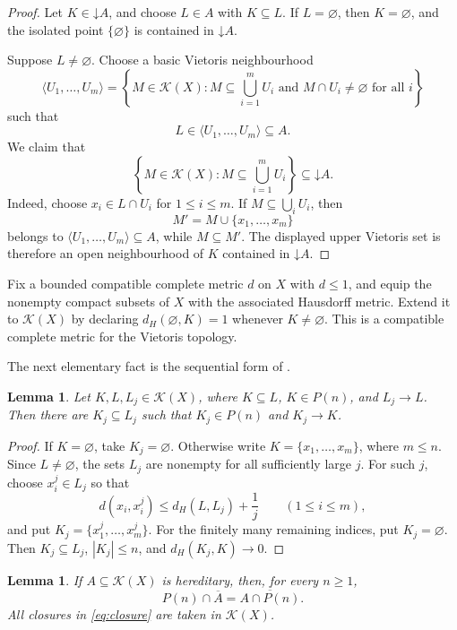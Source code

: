 \documentclass[10pt,a4paper]{amsart}
\newtheorem{lemma}[theorem]{Lemma}
\newcommand{\K}{\mathcal K}
\newcommand{\cl}[1]{\overline{#1}}
\newcommand{\down}[1]{\mathord{\downarrow}\!#1}
\begin{document}
\begin{proof}
Let $K\in\down A$, and choose $L\in A$ with $K\subseteq L$.
If $L=\varnothing$, then $K=\varnothing$, and the isolated point
$\{\varnothing\}$ is contained in $\down A$.

Suppose $L\neq\varnothing$. Choose a basic Vietoris neighbourhood
\[
\langle U_1,\ldots,U_m\rangle
=
\left\{
M\in\K(X):
M\subseteq\bigcup_{i=1}^m U_i
\text{ and }
M\cap U_i\neq\varnothing\text{ for all }i
\right\}
\]
such that
\[
L\in\langle U_1,\ldots,U_m\rangle\subseteq A.
\]
We claim that
\[
\left\{
M\in\K(X):M\subseteq\bigcup_{i=1}^m U_i
\right\}
\subseteq\down A.
\]
Indeed, choose $x_i\in L\cap U_i$ for $1\leq i\leq m$. If
$M\subseteq\bigcup_iU_i$, then
\[
M'=M\cup\{x_1,\ldots,x_m\}
\]
belongs to $\langle U_1,\ldots,U_m\rangle\subseteq A$, while
$M\subseteq M'$. The displayed upper Vietoris set is therefore an open
neighbourhood of $K$ contained in $\down A$.
\end{proof}

Fix a bounded compatible complete metric $d$ on $X$ with $d \leq 1$, and equip the nonempty compact subsets of $X$ with the
associated Hausdorff metric. Extend it to $\K(X)$ by declaring
$d_H(\varnothing,K)=1$ whenever $K\neq\varnothing$. This is a compatible
complete metric for the Vietoris topology.

The next elementary fact is the sequential form of
\cite[Lemma~2.6(i)]{MZ05}.

\begin{lemma}\label{lem:finite-approx}
Let $K,L,L_j\in\K(X)$, where $K\subseteq L$, $K\in P(n)$, and
$L_j\to L$. Then there are $K_j\subseteq L_j$ such that
$K_j\in P(n)$ and $K_j\to K$.
\end{lemma}

\begin{proof}
If $K=\varnothing$, take $K_j=\varnothing$. Otherwise write
$K=\{x_1,\ldots,x_m\}$, where $m\leq n$. Since $L\neq\varnothing$,
the sets $L_j$ are nonempty for all sufficiently large $j$. For such
$j$, choose $x_i^j\in L_j$ so that
\[
d(x_i,x_i^j)\leq d_H(L,L_j)+\frac1j
\qquad (1\leq i\leq m),
\]
and put $K_j=\{x_1^j,\ldots,x_m^j\}$. For the finitely many remaining
indices, put $K_j=\varnothing$. Then $K_j\subseteq L_j$,
$|K_j|\leq n$, and $d_H(K_j,K)\to0$.
\end{proof}

\begin{lemma}\label{lem:closure}
If $A\subseteq\K(X)$ is hereditary, then, for every $n\geq1$,
\begin{equation}\label{eq:closure}
P(n)\cap\cl A=\cl{A\cap P(n)}.
\end{equation}
All closures in \eqref{eq:closure} are taken in $\K(X)$.
\end{lemma}
\end{document}
